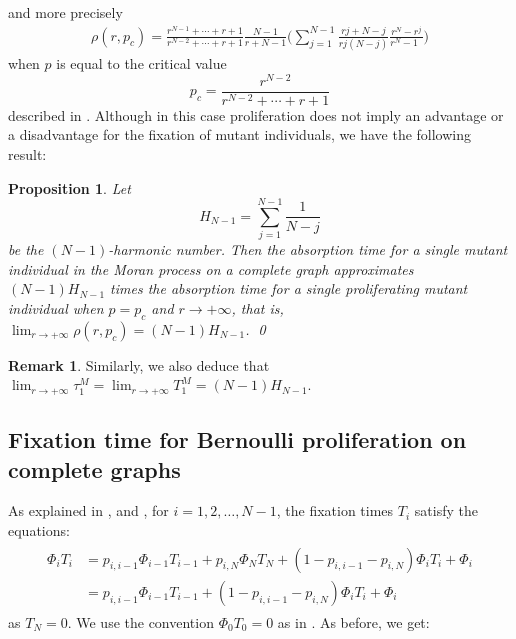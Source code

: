 \documentclass[a4paper,english,10pt]{amsart}
\newtheorem{proposition}{\bf Proposition}[section]
\theoremstyle{definition}
\newtheorem{remark}{Remark}
\numberwithin{equation}{section}
\begin{document}
and more precisely
\begin{align} 
\label{eq:abs_criticalrate}
\rho(r,p_c) = \frac{r^{N-1} + \cdots + r + 1}{r^{N-2} + \cdots + r +1}\frac{N-1}{r+N-1} 
\Big( \sum_{j=1}^{N-1}
\frac{rj+N-j}{rj(N-j)}\frac{r^N - r^j}{r^N-1\phantom{o}} \Big)
\end{align}
when $p$ is equal to the critical value 
$$p_c = \frac{r^{N-2}}{r^{N-2} + \cdots + r +1}$$
described in \cite{AlcaldeGuerberoffLozano2022}. 
 Although in this case proliferation does not imply an advantage or a disadvantage for the fixation of mutant individuals, we have the following result: 
\begin{proposition} \label{prop:AR_complete}
Let $$H_{N-1} = \sum_{j=1}^{N-1} \frac{1}{N-j}$$ 
be the $(N-1)$-harmonic number. Then the absorption time for a single mutant individual in the Moran process on a complete graph approximates $(N-1)H_{N-1}$ times the absorption time for a single proliferating mutant individual when $p=p_c$ and $r \to +\infty$, that is, 
$\lim_{r \to +\infty} \rho(r,p_c)  = (N-1) H_{N-1}$. \qed
\end{proposition}

\begin{remark} \label{rem:redcomplete}
Similarly, we also deduce that $\lim_{r \to +\infty} \tau_1^M = \lim_{r \to +\infty} T_1^M = (N-1) H_{N-1}$.
\end{remark}

\subsection{Fixation time for Bernoulli proliferation on complete graphs}

As explained in \cite{Antal2006}, \cite{BHR} and \cite{H}, for $i=1,2, \ldots, N-1$, the fixation times $T_i$ satisfy the equations:
\begin{align}   \label{eq:TFcomp}
\begin{split}
    \Phi_i T_i  & = p_{i,i-1} \Phi_{i-1} T_{i-1} + p_{i,N} \Phi_N T_N + (1 -  p_{i,i-1} -  p_{i,N}) \Phi_i T_i  + \Phi_i \\
   & = p_{i,i-1}\Phi_{i-1} T_{i-1} + (1 -  p_{i,i-1} -  p_{i,N}) \Phi_i T_i  + \Phi_i 
\end{split}
 \end{align}
as $T_N =0$. We use the convention $\Phi_{0} T_{0} =0$ as in \cite{H}. As before, we get:
\end{document}
